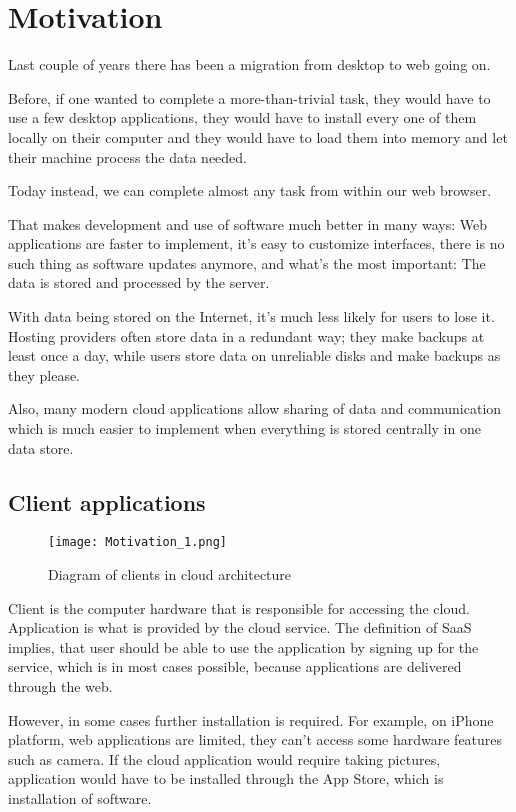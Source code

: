\section{Motivation}

Last couple of years there has been a migration from desktop to web going on.

Before, if one wanted to complete a more-than-trivial task, they would have to use a few desktop applications, they would have to install every one of them locally on their computer and they would have to load them into memory and let their machine process the data needed.

Today instead, we can complete almost any task from within our web browser.

That makes development and use of software much better in many ways: Web applications are faster to implement, it’s easy to customize interfaces, there is no such thing as software updates anymore, and what’s the most important: The data is stored and processed by the server.

With data being stored on the Internet, it’s much less likely for users to lose it. Hosting providers often store data in a redundant way; they make backups at least once a day, while users store data on unreliable disks and make backups as they please.

Also, many modern cloud applications allow sharing of data and communication which is much easier to implement when everything is stored centrally in one data store.

\subsection{Client applications}

\begin{figure}[ht!]
\centering
\texttt{[image: Motivation\_1.png]}
\caption{Diagram of clients in cloud architecture \label{fig:1}}
\end{figure}

Client is the computer hardware that is responsible for accessing the cloud. Application is what is provided by the cloud service. The definition of SaaS implies, that user should be able to use the application by signing up for the service, which is in most cases possible, because applications are delivered through the web.

However, in some cases further installation is required. For example, on iPhone platform, web applications are limited, they can’t access some hardware features such as camera. If the cloud application would require taking pictures, application would have to be installed through the App Store, which is installation of software.
 	
